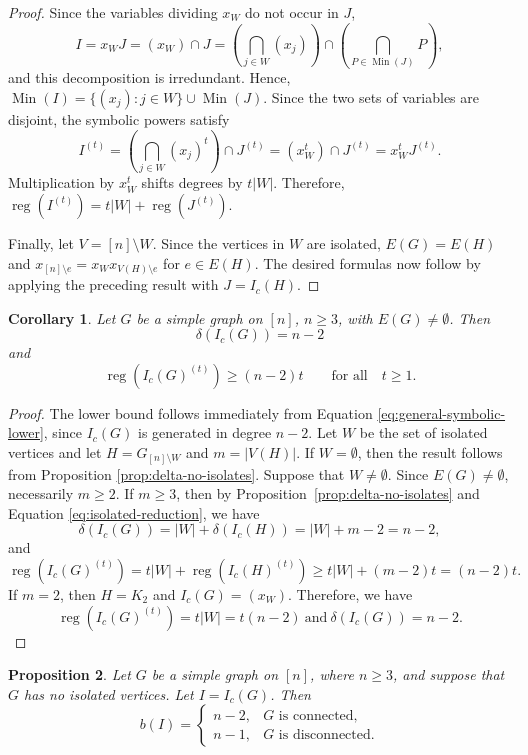 \documentclass[12pt]{amsart}
\newtheorem{proposition}{Proposition}[section]
\newtheorem{corollary}[proposition]{Corollary}
\DeclareMathOperator{\reg}{reg}
\DeclareMathOperator{\Min}{Min}
\begin{document}
\begin{proof}
Since the variables dividing $x_W$ do not occur in $J$,
\[
I=x_WJ=(x_W)\cap J=\left(\bigcap_{j\in W}(x_j)\right)\cap\left(\bigcap_{P\in\Min(J)}P\right),
\]
and this decomposition is irredundant. Hence, $\Min(I)=\{(x_j) :j\in W\}\cup\Min(J)$. Since the two sets of variables are disjoint, the symbolic powers satisfy
\[
I^{(t)}=\left(\bigcap_{j\in W}(x_j)^t\right)\cap J^{(t)}=(x_W^t)\cap J^{(t)}=x_W^tJ^{(t)}.
\]
Multiplication by $x_W^t$ shifts degrees by $t|W|$. Therefore, \(\reg(I^{(t)})=t|W|+\reg(J^{(t)}).\)

Finally, let $V=[n]\setminus W$. Since the vertices in $W$ are isolated, $E(G)=E(H)$ and $x_{[n]\setminus e}=x_Wx_{V(H)\setminus e}$ for $e\in E(H)$. The desired formulas now follow by applying the preceding result with $J=I_c(H)$.
\end{proof}


\begin{corollary}\label{cor:delta-and-lower}
Let $G$ be a simple graph on $[n]$, $n\ge 3$, with $E(G)\neq\emptyset$. Then   $$\delta(I_c(G))=n-2$$
and
\begin{equation}\label{eq:lower-main}
\reg(I_c(G)^{(t)})\ge(n-2)t \qquad \text{for all} \quad t \ge 1.
\end{equation}
\end{corollary}

\begin{proof}
The lower bound follows immediately from Equation \eqref{eq:general-symbolic-lower}, since $I_c(G)$ is generated in degree $n-2$. Let $W$ be the set of isolated vertices and let $H=G_{[n]\setminus W}$ and $m=|V(H)|$. If $W=\emptyset$, then the result follows from Proposition \ref{prop:delta-no-isolates}. Suppose that $W\neq\emptyset$. Since $E(G)\neq\emptyset$, necessarily $m\ge2$. If $m\ge3$, then by Proposition~\ref{prop:delta-no-isolates} and Equation \eqref{eq:isolated-reduction}, we have
\[
\delta(I_c(G))=|W|+\delta(I_c(H))=|W|+m-2=n-2,
\]
and 
\[\reg(I_c(G)^{(t)})=t|W|+\reg(I_c(H)^{(t)}) \geq t|W|+ (m-2)t = (n-2)t . \]
If $m=2$, then $H=K_2$ and $I_c(G)=(x_W)$. Therefore, we have
\[\reg(I_c(G)^{(t)})=t|W|=t(n-2) \ \text{and} \ \delta(I_c(G))=n-2 . \]
\end{proof}


\begin{proposition}\label{prop:b-value}
Let $G$ be a simple graph on $[n]$, where $n\ge3$, and suppose that $G$ has no isolated vertices. Let $I=I_c(G)$. Then
\[
b(I)=
\begin{cases}
n-2,&G\text{ is connected},\\
n-1,&G\text{ is disconnected}.
\end{cases}
\]
\end{proposition}
\end{document}
